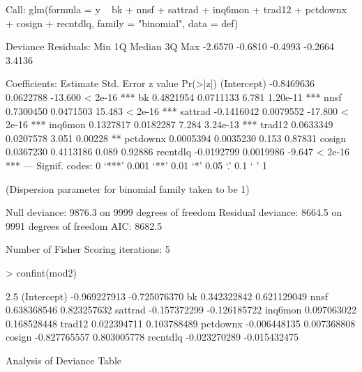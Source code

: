 \documentclass{article}
\begin{document}
\begin{center}
\begin{Schunk}
\begin{Soutput}
Call:
glm(formula = y ~ bk + nnsf + sattrad + inq6mon + trad12 + pctdownx + 
    cosign + recntdlq, family = "binomial", data = def)

Deviance Residuals: 
    Min       1Q   Median       3Q      Max  
-2.6570  -0.6810  -0.4993  -0.2664   3.4136  

Coefficients:
              Estimate Std. Error z value Pr(>|z|)    
(Intercept) -0.8469636  0.0622788 -13.600  < 2e-16 ***
bk           0.4821954  0.0711133   6.781 1.20e-11 ***
nnsf         0.7300450  0.0471503  15.483  < 2e-16 ***
sattrad     -0.1416042  0.0079552 -17.800  < 2e-16 ***
inq6mon      0.1327817  0.0182287   7.284 3.24e-13 ***
trad12       0.0633349  0.0207578   3.051  0.00228 ** 
pctdownx     0.0005394  0.0035230   0.153  0.87831    
cosign       0.0367230  0.4113186   0.089  0.92886    
recntdlq    -0.0192799  0.0019986  -9.647  < 2e-16 ***
---
Signif. codes:  0 ‘***’ 0.001 ‘**’ 0.01 ‘*’ 0.05 ‘.’ 0.1 ‘ ’ 1

(Dispersion parameter for binomial family taken to be 1)

    Null deviance: 9876.3  on 9999  degrees of freedom
Residual deviance: 8664.5  on 9991  degrees of freedom
AIC: 8682.5

Number of Fisher Scoring iterations: 5
\end{Soutput}
\begin{Sinput}
> confint(mod2)
\end{Sinput}
\begin{Soutput}
                   2.5 %       97.5 %
(Intercept) -0.969227913 -0.725076370
bk           0.342322842  0.621129049
nnsf         0.638368546  0.823257632
sattrad     -0.157372299 -0.126185722
inq6mon      0.097063022  0.168528448
trad12       0.022394711  0.103788489
pctdownx    -0.006448135  0.007368808
cosign      -0.827765557  0.803005778
recntdlq    -0.023270289 -0.015432475
\end{Soutput}
\begin{Soutput}
Analysis of Deviance Table


\end{Soutput}
\end{Schunk}
\end{center}
\end{document}
